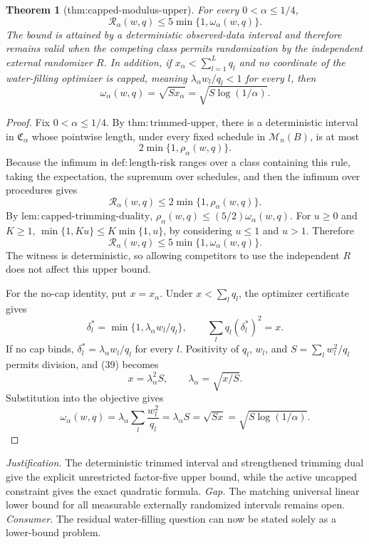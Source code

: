 \documentclass{article}
\newtheorem{theorem}{Theorem}
\begin{document}
\begin{theorem}[thm:capped-modulus-upper]\label{thm:capped-modulus-upper}
For every \(0<\alpha\le1/4\),
\[
 \mathcal R_\alpha(w,q)\le5\min\{1,\omega_\alpha(w,q)\}.
\]
The bound is attained by a deterministic observed-data interval and therefore remains valid when the competing class permits randomization by the independent external randomizer \(R\). In addition, if \(x_\alpha<\sum_{l=1}^Lq_l\) and no coordinate of the water-filling optimizer is capped, meaning \(\lambda_\alpha w_l/q_l<1\) for every \(l\), then
\[
 \omega_\alpha(w,q)=\sqrt{Sx_\alpha}=\sqrt{S\log(1/\alpha)}.
\]
\end{theorem}
\begin{proof}
Fix \(0<\alpha\le1/4\). By \(\mathrm{thm{:}trimmed\text{-}upper}\), there is a deterministic interval in \(\mathfrak C_\alpha\) whose pointwise length, under every fixed schedule in \(\mathcal M_n(B)\), is at most
\[
 2\min\{1,\rho_\alpha(w,q)\}.
\tag{36}
\]
Because the infimum in \(\mathrm{def{:}length\text{-}risk}\) ranges over a class containing this rule, taking the expectation, the supremum over schedules, and then the infimum over procedures gives
\[
 \mathcal R_\alpha(w,q)\le2\min\{1,\rho_\alpha(w,q)\}.
\tag{37}
\]
By \(\mathrm{lem{:}capped\text{-}trimming\text{-}duality}\), \(\rho_\alpha(w,q)\le(5/2)\omega_\alpha(w,q)\). For \(u\ge0\) and \(K\ge1\), \(\min\{1,Ku\}\le K\min\{1,u\}\), by considering \(u\le1\) and \(u>1\). Therefore
\[
 \mathcal R_\alpha(w,q)\le5\min\{1,\omega_\alpha(w,q)\}.
\tag{38}
\]
The witness is deterministic, so allowing competitors to use the independent \(R\) does not affect this upper bound.

For the no-cap identity, put \(x=x_\alpha\). Under \(x<\sum_lq_l\), the optimizer certificate gives
\[
 \delta_l^*=\min\{1,\lambda_\alpha w_l/q_l\},
 \qquad
 \sum_lq_l(\delta_l^*)^2=x.
\tag{39}
\]
If no cap binds, \(\delta_l^*=\lambda_\alpha w_l/q_l\) for every \(l\). Positivity of \(q_l\), \(w_l\), and \(S=\sum_lw_l^2/q_l\) permits division, and (39) becomes
\[
 x=\lambda_\alpha^2S,
 \qquad
 \lambda_\alpha=\sqrt{x/S}.
\tag{40}
\]
Substitution into the objective gives
\[
 \omega_\alpha(w,q)
 =\lambda_\alpha\sum_l\frac{w_l^2}{q_l}
 =\lambda_\alpha S
 =\sqrt{Sx}
 =\sqrt{S\log(1/\alpha)}.
\tag{41}
\]
\end{proof}
\par\smallskip\noindent \textit{Justification.} The deterministic trimmed interval and strengthened trimming dual give the explicit unrestricted factor-five upper bound, while the active uncapped constraint gives the exact quadratic formula. \textit{Gap.} The matching universal linear lower bound for all measurable externally randomized intervals remains open. \textit{Consumer.} The residual water-filling question can now be stated solely as a lower-bound problem.
\end{document}
